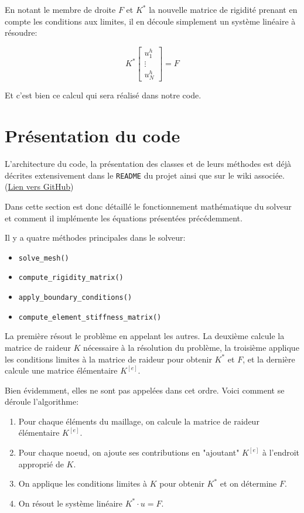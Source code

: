 \documentclass{article}
\begin{document}
En notant le membre de droite $F$ et $K^*$ la nouvelle
matrice de rigidité prenant en compte les conditions aux limites,
il en découle simplement un système linéaire à résoudre:

\begin{equation}
    K^*
    \begin{bmatrix}
        u^h_1 \\ \vdots \\ u^h_N
    \end{bmatrix}
    = F
\end{equation}

Et c'est bien ce calcul qui sera réalisé dans notre code.

\newpage

\section{Présentation du code}

L'architecture du code, la présentation des classes et de leurs
méthodes est déjà décrites extensivement dans le \verb|README|
du projet ainsi que sur le wiki associée.
(\href{https://github.com/LuciferC-137/FiniteElementElec}{Lien vers GitHub})

Dans cette section est donc détaillé le fonctionnement
mathématique du solveur et comment il implémente les équations
présentées précédemment.

Il y a quatre méthodes principales dans le solveur:

\begin{itemize}
    \item \verb|solve_mesh()|
    \item \verb|compute_rigidity_matrix()|
    \item \verb|apply_boundary_conditions()|
    \item \verb|compute_element_stiffness_matrix()|
\end{itemize}

La première résout le problème en appelant les autres.
La deuxième calcule la matrice de raideur $K$ nécessaire à la
résolution du problème, la troisième applique les conditions
limites à la matrice de raideur pour obtenir $K^*$ et $F$, et la dernière calcule
une matrice élémentaire $K^{[e]}$.

Bien évidemment, elles ne sont pas appelées dans cet ordre. Voici
comment se déroule l'algorithme:

\begin{enumerate}
    \item Pour chaque éléments du maillage,
    on calcule la matrice de raideur élémentaire $K^{[e]}$.
    \item Pour chaque noeud, on ajoute ses contributions en "ajoutant" $K^{[e]}$ à l'endroit approprié de $K$.
    \item On applique les conditions limites à $K$ pour obtenir $K^*$ et on détermine $F$.
    \item On résout le système linéaire $K^* \cdot u = F$.
\end{enumerate}
\end{document}
